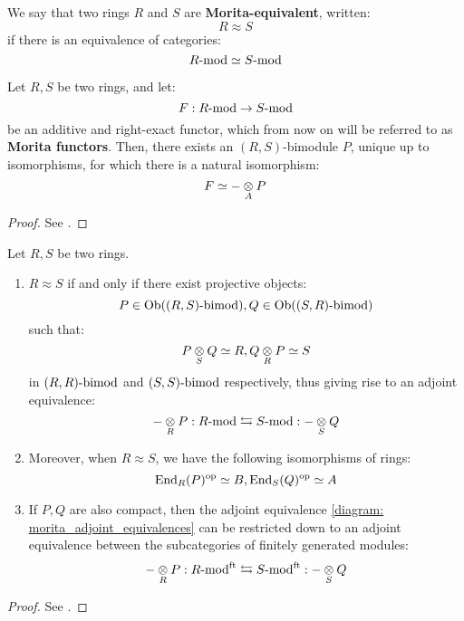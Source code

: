         We say that two rings $R$ and $S$ are \textbf{Morita-equivalent}, written:
            $$R \approx S$$
        if there is an equivalence of categories:
            $$R\mod \cong S\mod$$
        \begin{proposition} \label{prop: additive_right_exact_functors_between_module_categories}
            Let $R, S$ be two rings, and let:
                $$F: R\mod \to S\mod$$
            be an additive and right-exact functor, which from now on will be referred to as \textbf{Morita functors}. Then, there exists an $(R, S)$-bimodule $P$, unique up to isomorphisms, for which there is a natural isomorphism:
                $$F \cong - \tensor_A P$$
        \end{proposition}
            \begin{proof}
                See \cite[Theorem 2.3.1]{ginzburg_lectures_on_noncommutative_geometry}.
            \end{proof}
        \begin{corollary}
            Let $R, S$ be two rings.
            \begin{enumerate}
                \item $R \approx S$ if and only if there exist projective objects:
                    $$P \in \Ob( (R, S)\bimod ), Q \in \Ob( (S, R)\bimod )$$
                such that:
                    $$P \tensor_S Q \cong R, Q \tensor_R P \cong S$$
                in $(R, R)\bimod$ and $(S, S)\bimod$ respectively, thus giving rise to an adjoint equivalence:
                    \begin{equation} \label{diagram: morita_adjoint_equivalences}
                        - \tensor_R P: R\mod \leftrightarrows S\mod: - \tensor_S Q
                    \end{equation}
                \item Moreover, when $R \approx S$, we have the following isomorphisms of rings:
                    $$\End_R(P)^{\op} \cong B, \End_S(Q)^{\op} \cong A$$
                \item If $P, Q$ are also compact, then the adjoint equivalence \eqref{diagram: morita_adjoint_equivalences} can be restricted down to an adjoint equivalence between the subcategories of finitely generated modules:
                    $$
                        - \tensor_R P: R\mod^{\ft} \leftrightarrows S\mod^{\ft}: - \tensor_S Q
                    $$
            \end{enumerate}
        \end{corollary}
        \begin{corollary}
            
        \end{corollary}
            \begin{proof}
                See \cite[Corollary 2.3.4]{ginzburg_lectures_on_noncommutative_geometry}.
            \end{proof}


